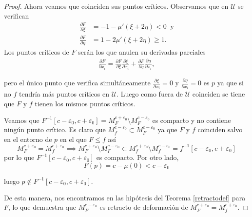 \begin{proof}
    \medskip

    Ahora veamos que coinciden sus puntos críticos. Observamos que en $\mathcal{U}$ se verifican
    \begin{align*}
        \frac{\partial F}{\partial \xi}&=-1-\mu'(\xi + 2\eta)<0 ~\text{ y}\\
        \frac{\partial F}{\partial \eta}&=1-2\mu'(\xi+2\eta)\ge 1.
    \end{align*}
    Los puntos críticos de $F$ serán los que anulen su derivadas parciales
    \begin{align*}
        \frac{\partial F}{\partial x_i}=\frac{\partial F}{\partial \xi}\frac{\partial \xi}{\partial x_i} + \frac{\partial F}{\partial \eta}\frac{\partial \eta}{\partial x_i},
    \end{align*}

    pero el único punto que verifica simultáneamente $\frac{\partial \xi}{\partial x_i}=0$ y $\frac{\partial \eta}{\partial x_i}=0$ es $p$ ya que si no $f$ tendría más puntos críticos en $\mathcal{U}$. Luego como fuera de $\mathcal{U}$ coinciden se tiene que  $F$ y $f$ tienen los mismos puntos críticos.

    \medskip

    Veamos que $F^{-1}[c-\varepsilon_0,c+\varepsilon_0]=M^{c+\varepsilon_0}_F\setminus M^{c-\varepsilon_0}_F$ es compacto y no contiene ningún punto crítico. Es claro que $M^{c-\varepsilon_0}_f\subset M^{c-\varepsilon_0}_F$ ya que $F$ y $f$ coinciden salvo en el entorno de $p$ en el que $F\le f$ así
    \begin{equation}
        M^{c+\varepsilon_0}_F=M^{c+\varepsilon_0}_f\implies M^{c+\varepsilon_0}_F\setminus M^{c-\varepsilon_0}_F \subset M^{c+\varepsilon_0}_f\setminus M^{c-\varepsilon_0}_f=f^{-1}[c-\varepsilon_0,c+\varepsilon_0]
    \end{equation}
    por lo que $F^{-1}[c-\varepsilon_0,c+\varepsilon_0]$ es compacto. Por otro lado,
    \begin{equation*}
        F(p)=c-\mu(0)<c-\varepsilon_0
    \end{equation*}

    luego $p\notin F^{-1}[c-\varepsilon_0,c+\varepsilon_0]$.

    \medskip

    De esta manera, nos encontramos en las hipótesis del Teorema \ref{retractodef} para $F$, lo que demuestra que $M^{c-\varepsilon_0}_F$ es retracto de deformación de $M^{c+\varepsilon_0}_F=M^{c+\varepsilon_0}_f$.

    \bigskip


\end{proof}
